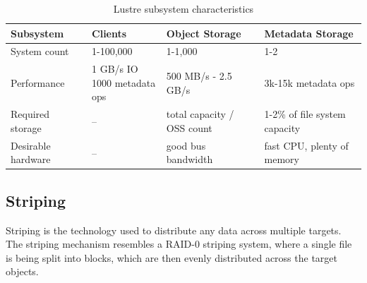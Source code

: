 \newcommand{\specialcell}[2][t]{\begin{tabular}[#1]{@{}l@{}}#2\end{tabular}}

\begin{table}[htb]
    \centering
    \scriptsize

    \begin{tabularx}{\textwidth}{llll}
        \hline
          \textbf{Subsystem}
        & \textbf{Clients}
        & \textbf{Object Storage}
        & \textbf{Metadata Storage} \\\hline\hline
        System count
        & 1-100,000
        & 1-1,000
        & 1-2 \\\hline
        Performance
        & \specialcell{1 GB/s IO\\1000 metadata ops}
        & 500 MB/s - 2.5 GB/s
        & 3k-15k metadata ops \\\hline
        Required storage
        & --
        & total capacity / OSS count
        & 1-2\% of file system capacity \\\hline
          Desirable hardware
        & --
        & good bus bandwidth
        & fast CPU, plenty of memory \\\hline
    \end{tabularx}

    \caption{Lustre subsystem characteristics}
    \label{tab:characteristics}
\end{table}

\newpage
\subsection{Striping}

Striping is the technology used to distribute any data across multiple targets.
The striping mechanism resembles a RAID-0 striping system, where a single
file is being split into blocks, which are then evenly distributed across
the target objects.


